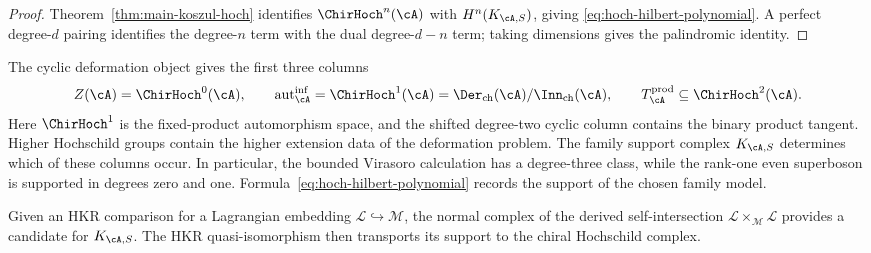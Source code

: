 \begin{proof}
Theorem~\ref{thm:main-koszul-hoch} identifies
\(\ChirHoch^n(\cA)\) with \(H^n(K_{\cA,S})\), giving
\eqref{eq:hoch-hilbert-polynomial}.  A perfect degree-\(d\) pairing
identifies the degree-\(n\) term with the dual degree-\(d-n\) term;
taking dimensions gives the palindromic identity.
\end{proof}

\begin{remark}
The cyclic deformation object gives the first three columns
\[
Z(\cA)=\ChirHoch^0(\cA),\qquad
\operatorname{aut}^{\inf}_{\cA}
=\ChirHoch^1(\cA)
=\Der_{\mathrm{ch}}(\cA)/\Inn_{\mathrm{ch}}(\cA),\qquad
T^{\mathrm{prod}}_\cA
\subseteq
\ChirHoch^2(\cA).
\]
Here \(\ChirHoch^1\) is the fixed-product automorphism space, and
the shifted degree-two cyclic column contains the binary product
tangent.  Higher Hochschild groups contain the higher extension data
of the deformation problem.  The family support complex
\(K_{\cA,S}\) determines which of these columns occur.  In
particular, the bounded Virasoro calculation has a degree-three class,
while the rank-one even superboson is supported in degrees zero and
one.  Formula~\eqref{eq:hoch-hilbert-polynomial} records the support
of the chosen family model.
\end{remark}

\begin{remark}
\label{rem:theorem-h-lagrangian}
Given an HKR comparison for a Lagrangian embedding
\(\mathcal L\hookrightarrow\mathcal M\), the normal complex of the
derived self-intersection
\(\mathcal L\times_{\mathcal M}\mathcal L\) provides a candidate
for \(K_{\cA,S}\).  The HKR quasi-isomorphism then transports its
support to the chiral Hochschild complex.
\end{remark}

